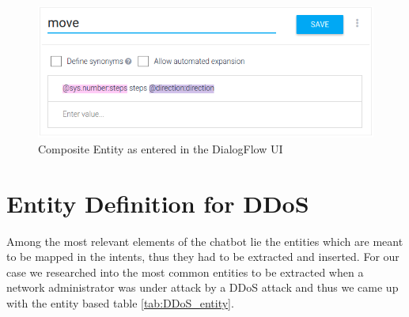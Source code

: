 \begin{figure}[!ht]
    \centering
    \includegraphics[scale=0.80]{MA-BA-Thesis/compositeEntity.png}
    \caption{Composite Entity as entered in the DialogFlow UI}
    \label{fig:compositeEntity}
\end{figure}

\section{Entity Definition for DDoS}
Among the most relevant elements of the chatbot lie the entities which are meant to be mapped in the intents, thus they had to be extracted and inserted. For our case we researched into the most common entities to be extracted when a network administrator was under attack by a DDoS attack and thus we came up with the entity based table \ref{tab:DDoS_entity}.

